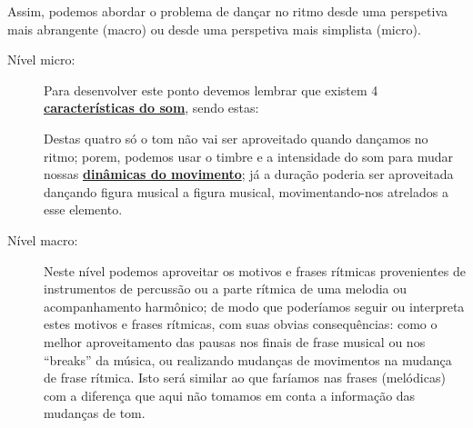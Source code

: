 Assim, podemos abordar o problema de dançar no ritmo 
desde uma perspetiva mais abrangente (macro) ou desde uma perspetiva mais simplista (micro).
\begin{description}
\item [Nível micro:] Para desenvolver este ponto devemos lembrar 
que existem 4 \hyperref[sec:carateristasom]{\textbf{características do som}},
sendo estas: 
Destas quatro só o tom não vai ser aproveitado quando dançamos no ritmo;
porem, podemos usar o timbre e a intensidade do som para mudar nossas 
\hyperref[sec:musicalidade:dinamicas]{\textbf{dinâmicas do movimento}};
já a duração poderia ser aproveitada dançando figura musical a figura musical,
movimentando-nos atrelados a esse elemento. 


\item [Nível macro:] Neste nível podemos aproveitar os  motivos e frases rítmicas
provenientes de instrumentos de percussão ou a parte rítmica de uma melodia ou acompanhamento harmônico;
de modo que poderíamos seguir ou interpreta estes motivos e frases rítmicas, 
com suas obvias consequências: como o melhor aproveitamento das pausas
 nos finais de frase musical ou nos ``breaks'' da música,
ou realizando mudanças de movimentos na mudança de frase rítmica.
Isto será similar ao que faríamos nas frases (melódicas) com a diferença que aqui 
não tomamos em conta a informação das mudanças de tom.
\end{description}


